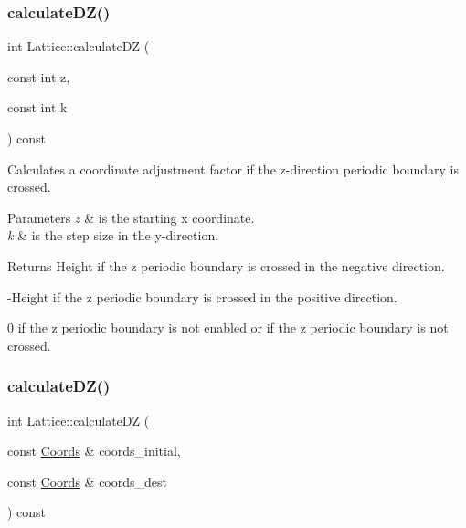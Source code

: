 \subsubsection{\texorpdfstring{calculate\+D\+Z()}{calculateDZ()}\hspace{0.1cm}{\footnotesize\ttfamily [1/2]}}
{\footnotesize\ttfamily int Lattice\+::calculate\+DZ (\begin{DoxyParamCaption}\item[{const int}]{z,  }\item[{const int}]{k }\end{DoxyParamCaption}) const}



Calculates a coordinate adjustment factor if the z-\/direction periodic boundary is crossed. 


\begin{DoxyParams}{Parameters}
{\em z} & is the starting x coordinate. \\
\hline
{\em k} & is the step size in the y-\/direction. \\
\hline
\end{DoxyParams}
\begin{DoxyReturn}{Returns}
Height if the z periodic boundary is crossed in the negative direction. 

-\/\+Height if the z periodic boundary is crossed in the positive direction. 

0 if the z periodic boundary is not enabled or if the z periodic boundary is not crossed. 
\end{DoxyReturn}
\mbox{\label{class_lattice_a76b38079e102e17c79b13a3398a404a0}} 
\subsubsection{\texorpdfstring{calculate\+D\+Z()}{calculateDZ()}\hspace{0.1cm}{\footnotesize\ttfamily [2/2]}}
{\footnotesize\ttfamily int Lattice\+::calculate\+DZ (\begin{DoxyParamCaption}\item[{const \hyperlink{struct_coords}{Coords} \&}]{coords\+\_\+initial,  }\item[{const \hyperlink{struct_coords}{Coords} \&}]{coords\+\_\+dest }\end{DoxyParamCaption}) const}




